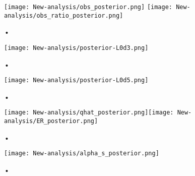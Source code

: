 \begin{figure}
\centering
\texttt{[image: New-analysis/obs\_posterior.png]}
\texttt{[image: New-analysis/obs\_ratio\_posterior.png]}
\caption{•}
\label{fig:new:obs_posterior}
\end{figure}

\begin{figure}
\centering
\texttt{[image: New-analysis/posterior-L0d3.png]}
\caption{•}
\label{fig:new:posterior-l0d3}
\end{figure}

\begin{figure}
\centering
\texttt{[image: New-analysis/posterior-L0d5.png]}
\caption{•}
\label{fig:new:posterior-l0d5}
\end{figure}

\begin{figure}
\centering
\texttt{[image: New-analysis/qhat\_posterior.png]}\texttt{[image: New-analysis/ER\_posterior.png]}
\caption{•}
\label{fig:new:posterior-qhat}
\end{figure}

\begin{figure}
\centering
\texttt{[image: New-analysis/alpha\_s\_posterior.png]}
\caption{•}
\label{fig:new:posterior-alphas}
\end{figure}
